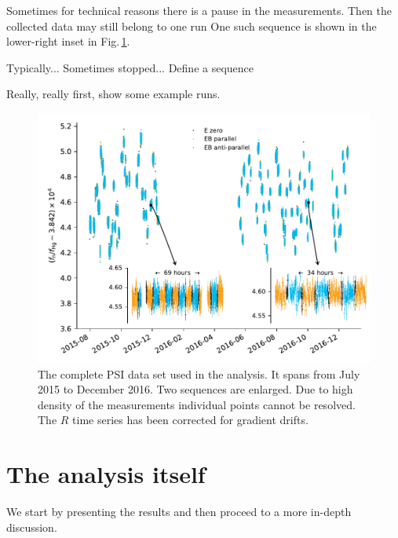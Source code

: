 Sometimes for technical reasons there is a pause in the measurements. Then the collected data may still belong to one run One such sequence is shown in the lower-right inset in Fig.\,\ref{fig:PSI_dataset_time_domain}.

Typically... Sometimes stopped... Define a sequence



Really, really first, show some example runs. 

\begin{figure}
  \centering
  \includegraphics[width=0.9\linewidth]{gfx/axions/deltah4mm_time_domain_inset_no_yerr.pdf}
  \caption{The complete PSI data set used in the analysis. It spans from July 2015 to December 2016. Two sequences are enlarged. Due to high density of the measurements individual points cannot be resolved. The $R$ time series has been corrected for gradient drifts.}
  \label{fig:PSI_dataset_time_domain}
\end{figure}


\section{The analysis itself}

We start by presenting the results and then proceed to a more in-depth discussion.





